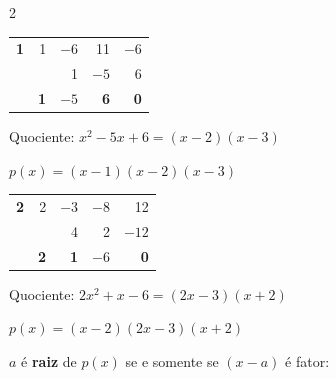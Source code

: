 \documentclass[12pt]{article}
\begin{document}
\begin{multicols}{2}

\vspace{0.2cm}
\begin{center}
\begin{tabular}{r|r r r r}
\textcolor{laranja}{\textbf{1}} & 1 & $-6$ & 11 & $-6$ \\
 & & 1 & $-5$ & 6 \\
\hline
 & \textcolor{verde}{\textbf{1}} & \textcolor{verde}{\textbf{$-5$}} & \textcolor{verde}{\textbf{6}} & \textcolor{laranja}{\textbf{0}} \\
\end{tabular}
\end{center}

Quociente: $x^2 - 5x + 6 = (x-2)(x-3)$

$\boxed{p(x) = (x-1)(x-2)(x-3)}$


\vspace{0.2cm}
\begin{center}
\begin{tabular}{r|r r r r}
\textcolor{laranja}{\textbf{2}} & 2 & $-3$ & $-8$ & 12 \\
 & & 4 & 2 & $-12$ \\
\hline
 & \textcolor{verde}{\textbf{2}} & \textcolor{verde}{\textbf{1}} & \textcolor{verde}{\textbf{$-6$}} & \textcolor{laranja}{\textbf{0}} \\
\end{tabular}
\end{center}

Quociente: $2x^2 + x - 6 = (2x-3)(x+2)$

$\boxed{p(x) = (x-2)(2x-3)(x+2)}$




$a$ é \textbf{raiz} de $p(x)$ se e somente se $(x-a)$ é fator:




\end{multicols}
\end{document}
